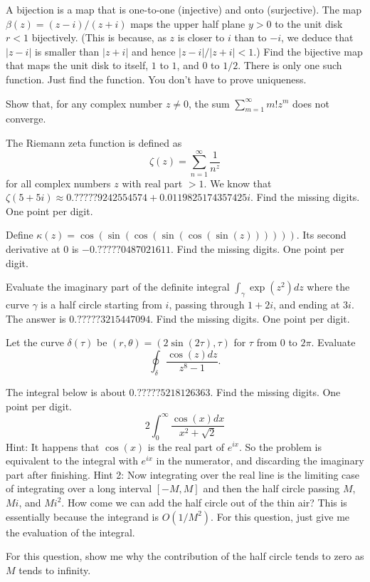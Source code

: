 \documentclass[a4paper]{article}
\begin{document}
\Problem
A bijection is a map that is one-to-one (injective) and onto (surjective).
The map $\beta(z) = (z - i) / (z + i)$
maps the upper half plane $y > 0$ to the unit disk $r < 1$ bijectively.
(This is because, as $z$ is closer to $i$ than to $-i$,
we deduce that $|z - i|$ is smaller than $|z + i|$
and hence $|z - i| / |z + i| < 1$.)
Find the bijective map that maps the unit disk to itself,
$1$ to $1$, and $0$ to $1/2$.
There is only one such function.
Just find the function.
You don't have to prove uniqueness.

\Problem
Show that, for any complex number $z \neq 0$, the sum
$\sum_{m=1}^\infty m! z^m$ does not converge.

\Problem
The Riemann zeta function is defined as
\[\zeta(z) = \sum_{n=1}^\infty \frac1{n^z}\]
for all complex numbers $z$ with real part $> 1$.
We know that $\zeta(5 + 5i) \approx 0.?????9242554574 + 0.0119825174357425i$.
Find the missing digits.
One point per digit.

\Problem
Define $\kappa(z) = \cos(\sin(\cos(\sin(\cos(\sin(z))))))$.
Its second derivative at $0$ is $-0.?????0487021611$.
Find the missing digits.
One point per digit.

\Problem
Evaluate the imaginary part of the definite integral
$\int_\gamma \exp(z^2) dz$
where the curve $\gamma$ is a half circle
starting from $i$, passing through $1 + 2i$, and ending at $3i$.
The answer is $0.?????3215447094$.
Find the missing digits.
One point per digit.

\Problem
Let the curve $\delta(\tau)$ be $(r, \theta) = (2 \sin(2\tau), \tau)$
for $\tau$ from $0$ to $2\pi$.
Evaluate
\[ \oint_\delta \frac{\cos(z) dz}{z^8 - 1}.  \]

\Problem
The integral below is about $0.?????5218126363$.
Find the missing digits.
One point per digit.
\[ 2\int_0^\infty \frac{\cos(x) dx}{x^2 + \sqrt{2}} \]
Hint: It happens that $\cos(x)$ is the real part of $e^{ix}$.
So the problem is equivalent to the integral with $e^{ix}$ in the numerator,
and discarding the imaginary part after finishing.
Hint 2: Now integrating over the real line
is the limiting case of integrating over a long interval $[-M, M]$
and then the half circle passing $M$, $Mi$, and $Mi^2$.
How come we can add the half circle out of the thin air?
This is essentially because the integrand is $O(1/M^2)$.
For this question, just give me the evaluation of the integral.

\Problem
For this question, show me why the contribution
of the half circle tends to zero as $M$ tends to infinity.
\end{document}
